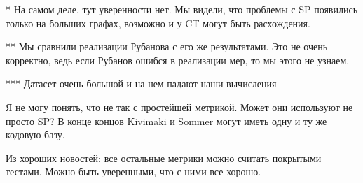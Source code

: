 \documentclass{article}
\begin{document}
{
\small
* На самом деле, тут уверенности нет. Мы видели, что проблемы с SP появились только на больших графах, возможно и у CT могут быть расхождения.

** Мы сравнили реализации Рубанова с его же результатами. Это не очень корректно, ведь если Рубанов ошибся в реализации мер, то мы этого не узнаем.

*** Датасет очень большой и на нем падают наши вычисления
}

\medskip

Я не могу понять, что не так с простейшей метрикой. Может они используют не просто SP? В конце концов Kivimaki и Sommer могут иметь одну и ту же кодовую базу.

Из хороших новостей: все остальные метрики можно считать покрытыми тестами. Можно быть уверенными, что с ними все хорошо.
\end{document}
